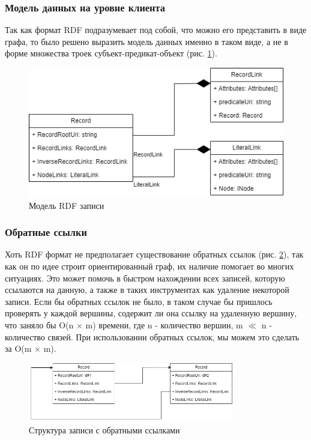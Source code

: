 \documentclass[12pt]{article}
\begin{document}
\subsubsection{Модель данных на уровне клиента}
\qquad Так как формат RDF подразумевает под собой, что можно его представить в виде графа, то было решено выразить модель данных именно в таком виде, а не в форме множества троек субъект-предикат-объект (рис. \ref{fig:record}).

\begin{figure}[!ht]
    \includegraphics[width=1\textwidth]{_images/record_literal.png}
    \caption{Модель RDF записи}
    \label{fig:record}
\end{figure}

\subsubsection{Обратные ссылки} \label{sect:inv_link}
\qquad Хоть RDF формат не предполагает существование обратных ссылок (рис. \ref{fig:inverse_link}), так как он по идее строит ориентированный граф, их наличие помогает во многих ситуациях. Это может помочь в быстром нахождении всех записей, которую ссылаются на данную, а также в таких инструментах как удаление некоторой записи. Если бы обратных ссылок не было, в таком случае бы пришлось проверять у каждой вершины, содержит ли она ссылку на удаленную вершину, что заняло бы O(n $\times$ m) времени, где n - количество вершин, m $\ll$ n - количество связей. При использовании обратных ссылок, мы можем это сделать за O(m $\times$ m).

\begin{figure}[!ht]
    \centering
    \includegraphics[width=0.8\textwidth]{_images/inverse_link.png}
    \caption{Структура записи с обратными ссылками}
    \label{fig:inverse_link}
\end{figure}
\end{document}
